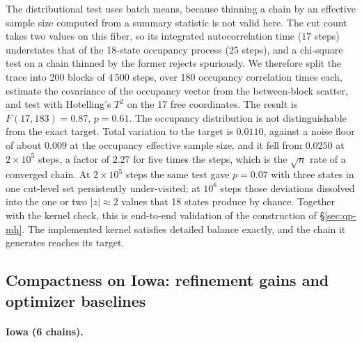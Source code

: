 \documentclass[11pt]{article}
\begin{document}
The distributional test uses batch means, because thinning a chain by
an effective sample size computed from a summary statistic is not
valid here. The cut count takes two values on this fiber, so its
integrated autocorrelation time ($17$ steps) understates that of the
18-state occupancy process ($25$ steps), and a chi-square test on a
chain thinned by the former rejects spuriously. We therefore split
the trace into 200 blocks of $4\,500$ steps, over 180 occupancy
correlation times each, estimate the covariance of the occupancy
vector from the between-block scatter, and test with Hotelling's
$T^2$ on the 17 free coordinates. The result is $F(17, 183) = 0.87$,
$p = 0.61$. The occupancy distribution is not distinguishable from
the exact target. Total variation to the target is $0.0110$, against
a noise floor of about $0.009$ at the occupancy effective sample
size, and it fell from $0.0250$ at $2 \times 10^5$ steps, a factor of
$2.27$ for five times the steps, which is the $\sqrt{n}$ rate of a
converged chain. At $2 \times 10^5$ steps the same test gave
$p = 0.07$ with three states in one cut-level set persistently
under-visited; at $10^6$ steps those deviations dissolved into the
one or two $|z| \approx 2$ values that 18 states produce by chance.
Together with the kernel check, this is end-to-end validation of the
construction of \S\ref{sec:qp-mh}. The implemented kernel satisfies
detailed balance exactly, and the chain it generates reaches its
target.

\subsection{Compactness on Iowa: refinement gains and optimizer baselines}\label{sec:exp-compactness}

\paragraph{Iowa (6 chains).}\label{sec:exp-iowa}
\end{document}
